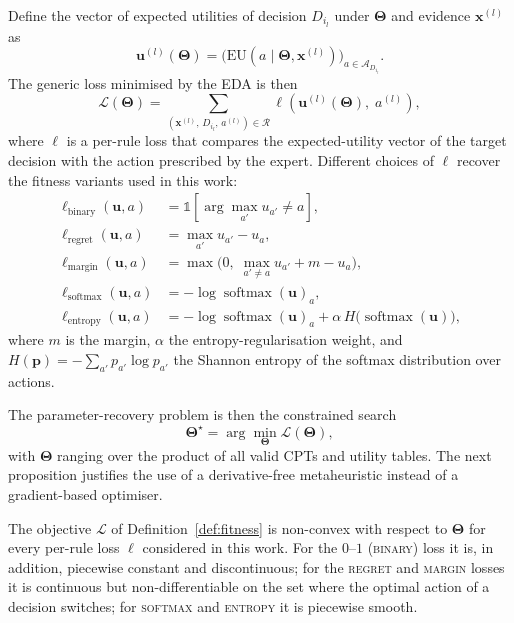 \begin{definition}
\label{def:fitness}
Define the vector of expected utilities of decision $D_{i_l}$ under
$\boldsymbol{\Theta}$ and evidence $\mathbf{x}^{(l)}$ as
\[
   \mathbf{u}^{(l)}(\boldsymbol{\Theta}) =
   \bigl(\mathrm{EU}(a \mid \boldsymbol{\Theta}, \mathbf{x}^{(l)})\bigr)_{a\in\mathcal{A}_{D_{i_l}}}.
\]
The generic loss minimised by the EDA is then
\[
   \mathcal{L}(\boldsymbol{\Theta}) =
   \sum_{(\mathbf{x}^{(l)},\,D_{i_l},\,a^{(l)})\in\mathcal{R}}
   \ell\!\left(\mathbf{u}^{(l)}(\boldsymbol{\Theta}),\; a^{(l)}\right),
\]
where $\ell$ is a per-rule loss that compares the expected-utility
vector of the target decision with the action prescribed by the
expert. Different choices of $\ell$ recover the fitness variants used
in this work:
\[
\begin{aligned}
   \ell_{\mathrm{binary}}(\mathbf{u}, a)  &= \mathbb{1}\!\left[\textstyle\arg\max_{a'} u_{a'} \neq a\right], \\[4pt]
   \ell_{\mathrm{regret}}(\mathbf{u}, a)  &= \max_{a'} u_{a'} - u_a, \\[4pt]
   \ell_{\mathrm{margin}}(\mathbf{u}, a)  &= \max\!\bigl(0,\; \max_{a'\neq a} u_{a'} + m - u_a\bigr), \\[4pt]
   \ell_{\mathrm{softmax}}(\mathbf{u}, a) &= -\log \operatorname{softmax}(\mathbf{u})_a, \\[4pt]
   \ell_{\mathrm{entropy}}(\mathbf{u}, a) &= -\log \operatorname{softmax}(\mathbf{u})_a + \alpha\, H\!\bigl(\operatorname{softmax}(\mathbf{u})\bigr),
\end{aligned}
\]
where $m$ is the margin, $\alpha$ the entropy-regularisation weight, and
$H(\mathbf{p}) = -\sum_{a'} p_{a'}\log p_{a'}$ the Shannon entropy of the
softmax distribution over actions.

\end{definition}

The parameter-recovery problem is then the constrained search
\[
   \boldsymbol{\Theta}^{\star} =
   \arg\min_{\boldsymbol{\Theta}} \mathcal{L}(\boldsymbol{\Theta}),
\]
with $\boldsymbol{\Theta}$ ranging over the product of all valid
CPTs and utility tables. The next proposition justifies the use of
a derivative-free metaheuristic instead of a gradient-based
optimiser.

\begin{proposition}
\label{prop:nonsmooth}
The objective $\mathcal{L}$ of Definition~\ref{def:fitness} is
non-convex with respect to $\boldsymbol{\Theta}$ for every per-rule
loss $\ell$ considered in this work. For the $0$--$1$ (\textsc{binary})
loss it is, in addition, piecewise constant and discontinuous; for the
\textsc{regret} and \textsc{margin} losses it is continuous but
non-differentiable on the set where the optimal action of a decision
switches; for \textsc{softmax} and \textsc{entropy} it is piecewise
smooth.
\end{proposition}

